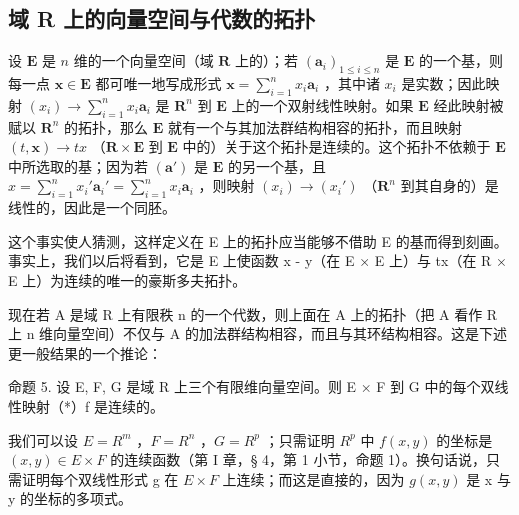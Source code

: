 \subsection{域 R 上的向量空间与代数的拓扑}

设 \(\mathbf{E}\) 是 \(n\) 维的一个向量空间（域 \(\mathbf{R}\) 上的）；若 \((\boldsymbol{a}_i)_{1 \leqslant i \leqslant n}\) 是 \(\mathbf{E}\) 的一个基，则每一点 \(\boldsymbol{x} \in \mathbf{E}\) 都可唯一地写成形式 \(\boldsymbol{x} = \sum_{i=1}^{n} x_i \boldsymbol{a}_i\) ，其中诸 \(x_i\) 是实数；因此映射 \((x_i) \to \sum_{i=1}^{n} x_i \boldsymbol{a}_i\) 是 \(\mathbf{R}^n\) 到 \(\mathbf{E}\) 上的一个双射线性映射。如果 \(\mathbf{E}\) 经此映射被赋以 \(\mathbf{R}^n\) 的拓扑，那么 \(\mathbf{E}\) 就有一个与其加法群结构相容的拓扑，而且映射 \((t, \boldsymbol{x}) \to tx\) （\(\mathbf{R} \times \mathbf{E}\) 到 \(\mathbf{E}\) 中的）关于这个拓扑是连续的。这个拓扑不依赖于 \(\mathbf{E}\) 中所选取的基；因为若 \((\boldsymbol{a}')\) 是 \(\mathbf{E}\) 的另一个基，且 \(x = \sum_{i=1}^{n} x_i' \boldsymbol{a}_i' = \sum_{i=1}^{n} x_i \boldsymbol{a}_i\) ，则映射 \((x_i) \to (x_i')\) （\(\mathbf{R}^n\) 到其自身的）是线性的，因此是一个同胚。

这个事实使人猜测，这样定义在 E 上的拓扑应当能够不借助 E 的基而得到刻画。事实上，我们以后将看到，它是 E 上使函数 x - y（在 E × E 上）与 tx（在 R × E 上）为连续的唯一的豪斯多夫拓扑。

现在若 A 是域 R 上有限秩 n 的一个代数，则上面在 A 上的拓扑（把 A 看作 R 上 n 维向量空间）不仅与 A 的加法群结构相容，而且与其环结构相容。这是下述更一般结果的一个推论：

命题 5. 设 E, F, G 是域 R 上三个有限维向量空间。则 E × F 到 G 中的每个双线性映射（*）f 是连续的。

我们可以设 \(E = R^{m}\) ，\(F = R^{n}\) ，\(G = R^{p}\) ；只需证明 \(R^{p}\) 中 \(f(x, y)\) 的坐标是 \((x, y) \in E \times F\) 的连续函数（第 I 章，§ 4，第 1 小节，命题 1）。换句话说，只需证明每个双线性形式 g 在 \(E \times F\) 上连续；而这是直接的，因为 \(g(x, y)\) 是 x 与 y 的坐标的多项式。

